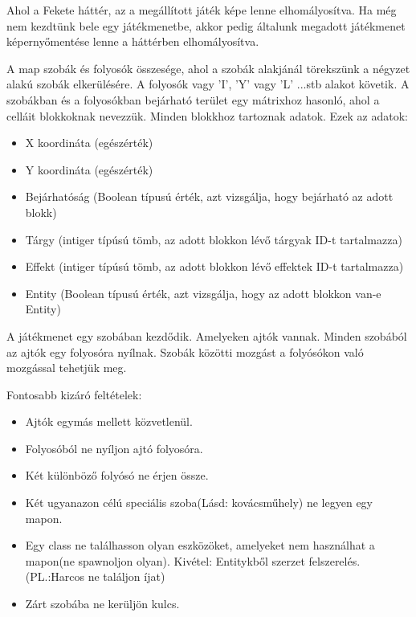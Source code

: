 Ahol a Fekete háttér, az a megállított játék képe lenne elhomályosítva.
Ha még nem kezdtünk bele egy játékmenetbe, akkor pedig általunk megadott játékmenet képernyőmentése lenne a háttérben elhomályosítva.



A map szobák és folyosók összesége, ahol a szobák alakjánál törekszünk a négyzet alakú szobák elkerülésére. A folyosók vagy 'I', 'Y' vagy 'L' ...stb alakot követik. A szobákban és a folyosókban bejárható terület egy mátrixhoz hasonló, ahol a celláit blokkoknak nevezzük.
Minden blokkhoz tartoznak adatok.
Ezek az adatok:
\begin{itemize}
    \item X koordináta (egészérték)
    \item Y koordináta (egészérték)
    \item Bejárhatóság (Boolean típusú érték, azt vizsgálja, hogy bejárható az adott blokk)
    \item Tárgy (intiger típúsú tömb, az adott blokkon lévő tárgyak ID-t tartalmazza)
    \item Effekt (intiger típúsú tömb, az adott blokkon lévő effektek ID-t tartalmazza)
    \item Entity (Boolean típusú érték, azt vizsgálja, hogy az adott blokkon van-e Entity)
\end{itemize}


A játékmenet egy szobában kezdődik. Amelyeken ajtók vannak. Minden szobából az ajtók egy folyosóra nyílnak. Szobák közötti mozgást a folyósókon való mozgással tehetjük meg.


Fontosabb kizáró feltételek:
\begin{itemize}
    \item Ajtók egymás mellett közvetlenül.
    \item Folyosóból ne nyíljon ajtó folyosóra.
    \item Két különböző folyósó ne érjen össze.
    \item Két ugyanazon célú speciális szoba(Lásd: kovácsműhely) ne legyen egy mapon.
    \item Egy class ne találhasson olyan eszközöket, amelyeket nem használhat a mapon(ne spawnoljon olyan). Kivétel: Entitykből szerzet felszerelés. (PL.:Harcos ne találjon íjat)
    \item Zárt szobába ne kerüljön kulcs.
\end{itemize}

